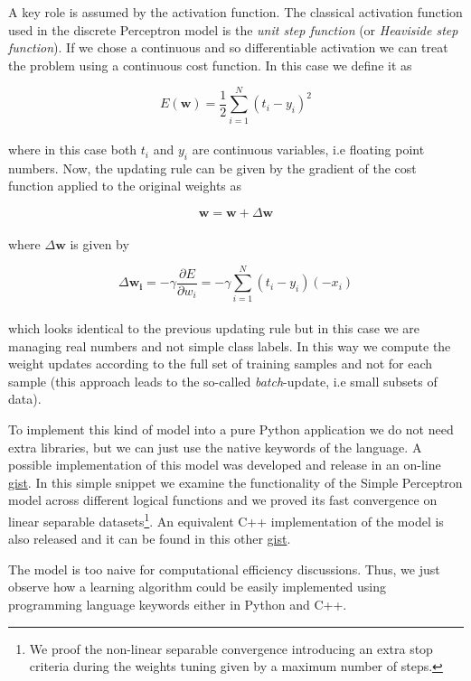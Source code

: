 \documentclass{standalone}
\begin{document}
A key role is assumed by the activation function.
The classical activation function used in the discrete Perceptron model is the \emph{unit step function} (or \emph{Heaviside step function}).
If we chose a continuous and so differentiable activation we can treat the problem using a continuous cost function.
In this case we define it as

\begin{equation}
E(\mathbf{w}) = \frac{1}{2}\sum_{i=1}^{N}\left( t_i - y_i \right)^2
\end{equation}
\\
where in this case both $t_i$ and $y_i$ are continuous variables, i.e floating point numbers.
Now, the updating rule can be given by the gradient of the cost function applied to the original weights as

\begin{equation}
\mathbf{w} = \mathbf{w} + \Delta\mathbf{w}
\end{equation}
\\
where $\Delta\mathbf{w}$ is given by

\begin{equation}
\Delta\mathbf{w_i} = -\gamma\frac{\partial E}{\partial w_i} = -\gamma\sum_{i=1}^{N} \left( t_i - y_i \right)\left(-x_i \right)
\end{equation}
\\
which looks identical to the previous updating rule but in this case we are managing real numbers and not simple class labels.
In this way we compute the weight updates according to the full set of training samples and not for each sample (this approach leads to the so-called \emph{batch}-update, i.e small subsets of data).

To implement this kind of model into a pure \textsf{Python} application we do not need extra libraries, but we can just use the native keywords of the language.
A possible implementation of this model was developed and release in an on-line \href{https://gist.github.com/Nico-Curti/358b7a2ffed1abbb57ee87a5338ca073}{gist}.
In this simple snippet we examine the functionality of the Simple Perceptron model across different logical functions and we proved its fast convergence on linear separable datasets\footnote{
  We proof the non-linear separable convergence introducing an extra stop criteria during the weights tuning given by a maximum number of steps.
}.
An equivalent \textsf{C++} implementation of the model is also released and it can be found in this other \href{https://gist.github.com/Nico-Curti/856c3baf523bc5d01b1e7dfe2515c0e2}{gist}.

The model is too naive for computational efficiency discussions.
Thus, we just observe how a learning algorithm could be easily implemented using programming language keywords either in \textsf{Python} and \textsf{C++}.
\end{document}
